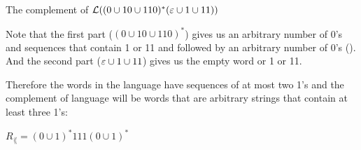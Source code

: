 The complement of $\mathcal{L}((0 \cup 10 \cup 110)^*(\varepsilon \cup 1 \cup 11))$

Note that the first part ($(0 \cup 10 \cup 110)^*$) gives us an arbitrary number of 0's
and sequences that contain 1 or 11 and followed by an arbitrary number of 0's ().
And the second part ($\varepsilon \cup 1 \cup 11$) gives us the empty word or 1 or 11.

Therefore the words in the language have sequences of at most two 1's
and the complement of language will be words that are arbitrary strings that contain at least three 1's:

$R_\lang = (0 \cup 1)^*111(0 \cup 1)^*$ \\